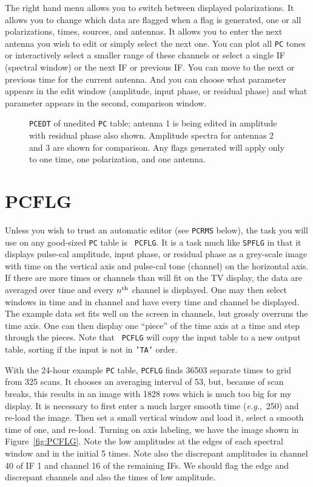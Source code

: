 \documentclass[twoside]{article}
\newcommand{\eg}{{\it e.g.},}
\newcommand{\putfig}[1]{\texttt{[image: \#1.eps]}}
\begin{document}
The right hand menu allows you to switch between displayed
polarizations.  It allows you to change which data are flagged when a
flag is generated, one or all polarizations, times, sources, and
antennas.  It allows you to enter the next antenna you wish to edit or
simply select the next one.  You can plot all {\tt PC} tones or
interactively select a smaller range of these channels or select a
single IF (spectral window) or the next IF or previous IF\@.  You can
move to the next or previous time for the current antenna.  And you
can choose what parameter appears in the edit window (amplitude, input
phase, or residual phase) and what parameter appears in the second,
comparison window.

\begin{figure}
\begin{center}
\resizebox{6.5in}{!}{\putfig{PCEDT}}
\caption{{\tt PCEDT} of unedited {\tt PC} table; antenna 1 is being
  edited in amplitude with residual phase also shown.  Amplitude
  spectra for antennas 2 and 3 are shown for comparison.  Any flags
  generated will apply only to one time, one polarization, and one
  antenna.}
\label{fig:PCEDT}
\end{center}
\end{figure}

\section{PCFLG}

Unless you wish to trust an automatic editor (see {\tt PCRMS} below),
the task you will use on any good-sized {\tt PC} table is {\tt
  PCFLG}\@.  It is a task much like {\tt SPFLG} in that it displays
pulse-cal amplitude, input phase, or residual phase as a grey-scale
image with time on the vertical axis and pulse-cal tone (channel) on
the horizontal axis.  If there are more times or channels than will
fit on the TV display, the data are averaged over time and every
$n^{\rm th}$ channel is displayed.  One may then select windows in
time and in channel and have every time and channel be displayed.
The example data set fits well on the screen in channels, but grossly
overruns the time axis.  One can then display one ``piece'' of the
time axis at a time and step through the pieces.  Note that {\tt
  PCFLG} will copy the input table to a new output table, sorting if
the input is not in {\tt 'TA'} order.

With the 24-hour example {\tt PC} table, {\tt PCFLG} finds 36503
separate times to grid from 325 scans.  It chooses an averaging
interval of 53, but, because of scan breaks, this results in an image
with 1828 rows which is much too big for my display.  It is necessary
to first enter a much larger smooth time (\eg\ 250) and re-load the
image.  Then set a small vertical window and load it, select a smooth
time of one, and re-load.  Turning on axis labeling, we have the
image shown in Figure~\ref{fig:PCFLG}.  Note the low amplitudes at the
edges of each spectral window and in the initial 5 times.  Note also
the discrepant amplitudes in channel 40 of IF 1 and channel 16 of the
remaining IFs.  We should flag the edge and discrepant channels and
also the times of low amplitude.
\end{document}
